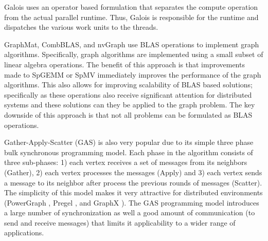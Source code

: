Galois \cite{pingali2011tao} uses an operator based formulation that separates the compute operation from the actual parallel runtime. Thus, Galois is responsible for the runtime and dispatches the various work units to the threads. 



GraphMat\cite{Sundaram:2015:GHP:2809974.2809983}, CombBLAS\cite{Buluc:2011:CBD:2076556.2076566}, and nvGraph \cite{nvGraph} use BLAS operations to implement graph algorithms. Specifically, graph algorithms are implemented using a small subset of linear algebra operations. 
The benefit of this approach is that improvements made to SpGEMM or SpMV immediately improves the performance of the graph algorithms. This also allows for improving scalability of BLAS based solutions; specifically as these operations also receive significant attention for distributed systems and these solutions can they be applied to the graph problem.
The key downside of this approach is that not all problems can be formulated as BLAS operations.



Gather-Apply-Scatter (GAS) is also very popular due to its simple three phase bulk synchronous programming model. Each phase in the algorithm consists of three sub-phases: 1) each vertex receives a set of messages from its neighbors (Gather), 2) each vertex processes the messages (Apply) and 3) each vertex sends a message to its neighbor after process the previous rounds of messages (Scatter). The simplicity of this model makes it very attractive for distributed environments (PowerGraph \cite{powergraph}, Pregel \cite{pregel}, and GraphX \cite{gonzalez2014graphx}). The GAS programming model introduces a large number of synchronization as well a good amount of communication (to send and receive messages) that limits it applicability to a wider range of applications.





